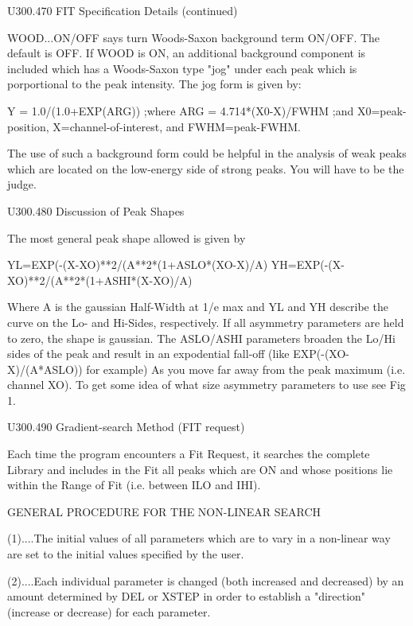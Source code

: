    U300.470  FIT Specification Details (continued)
 
   WOOD...ON/OFF says turn Woods-Saxon background term ON/OFF. The default  is
          OFF.  If  WOOD is ON, an additional background component is included
          which has  a  Woods-Saxon  type  "jog"  under  each  peak  which  is
          porportional to the peak intensity. The jog form is given by:
 
          Y    =  1.0/(1.0+EXP(ARG))    ;where
          ARG  =  4.714*(X0-X)/FWHM     ;and
          X0=peak-position, X=channel-of-interest, and FWHM=peak-FWHM.
 
          The  use  of such a background form could be helpful in the analysis
          of weak peaks which are located on the  low-energy  side  of  strong
          peaks. You will have to be the judge.
 
   U300.480  Discussion of Peak Shapes
 
   The most general peak shape allowed is given by
 
                    YL=EXP(-(X-XO)**2/(A**2*(1+ASLO*(XO-X)/A)
                    YH=EXP(-(X-XO)**2/(A**2*(1+ASHI*(X-XO)/A)
 
   Where  A  is  the gaussian Half-Width at 1/e max and YL and YH describe the
   curve on the Lo- and Hi-Sides, respectively. If  all  asymmetry  parameters
   are  held  to zero, the shape is gaussian. The ASLO/ASHI parameters broaden
   the Lo/Hi sides of the peak and result in  an  expodential  fall-off  (like
   EXP(-(XO-X)/(A*ASLO))  for  example)  As  you  move  far away from the peak
   maximum (i.e. channel  XO).  To  get  some  idea  of  what  size  asymmetry
   parameters to use see Fig 1.
 
   U300.490  Gradient-search Method (FIT request)
 
   Each  time  the  program encounters a Fit Request, it searches the complete
   Library and includes in the Fit all peaks which are ON and whose  positions
   lie within the Range of Fit (i.e. between ILO and IHI).
 
                   GENERAL PROCEDURE FOR THE NON-LINEAR SEARCH
 
   (1)....The  initial  values  of  all  parameters  which  are  to  vary in a
          non-linear way are set to the initial values specified by the user.
 
   (2)....Each individual parameter is changed (both increased and  decreased)
          by  an  amount  determined  by  DEL or XSTEP in order to establish a
          "direction" (increase or decrease) for each parameter.
 
